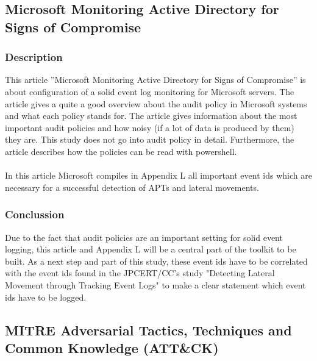 \clearpage

\subsection{Microsoft Monitoring Active Directory for Signs of Compromise}
\subsubsection{Description}
This article ''Microsoft Monitoring Active Directory for Signs of Compromise'' \cite{MSADSignsOfCompromise} is about configuration of a solid event log monitoring for Microsoft servers. The article gives a quite a good overview about the audit policy in Microsoft systems and what each policy stands for. The article gives information about the most important audit policies and how noisy (if a lot of data is produced by them) they are. This study does not go into audit policy in detail. Furthermore, the article describes how the policies can be read with powershell.
\\\\
In this article Microsoft compiles in Appendix L \cite{MSAppendixL} all important event ids which are necessary for a successful detection of APTs and lateral movements.

\subsubsection{Conclussion}
Due to the fact that audit policies are an important setting for solid event logging, this article and Appendix L will be a central part of the toolkit to be built. As a next step and part of this study, these event ids have to be correlated with the event ids found in the JPCERT/CC's study "Detecting Lateral Movement through Tracking Event Logs" \cite{JPCERTDetectingLateralMovement} to make a clear statement which event ids have to be logged.

\subsection{MITRE Adversarial Tactics, Techniques and Common Knowledge (ATT\&CK)}
